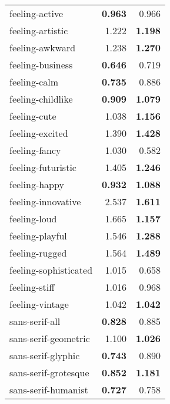 \begin{longtable}{|l|r|r|}
feeling-active            & \textbf{0.963}          & 0.966               \\
feeling-artistic          & 1.222                   & \textbf{1.198}      \\
feeling-awkward           & 1.238                   & \textbf{1.270}      \\
feeling-business          & \textbf{0.646}          & 0.719               \\
feeling-calm              & \textbf{0.735}          & 0.886               \\
feeling-childlike         & \textbf{0.909}          & \textbf{1.079}      \\
feeling-cute              & 1.038                   & \textbf{1.156}      \\
feeling-excited           & 1.390                   & \textbf{1.428}      \\
feeling-fancy             & 1.030                   & 0.582               \\
feeling-futuristic        & 1.405                   & \textbf{1.246}      \\
feeling-happy             & \textbf{0.932}          & \textbf{1.088}      \\
feeling-innovative        & 2.537                   & \textbf{1.611}      \\
feeling-loud              & 1.665                   & \textbf{1.157}      \\
feeling-playful           & 1.546                   & \textbf{1.288}      \\
feeling-rugged            & 1.564                   & \textbf{1.489}      \\
feeling-sophisticated     & 1.015                   & 0.658               \\
feeling-stiff             & 1.016                   & 0.968               \\
feeling-vintage           & 1.042                   & \textbf{1.042}      \\
sans-serif-all            & \textbf{0.828}          & 0.885               \\
sans-serif-geometric      & 1.100                   & \textbf{1.026}      \\
sans-serif-glyphic        & \textbf{0.743}          & 0.890               \\
sans-serif-grotesque      & \textbf{0.852}          & \textbf{1.181}      \\
sans-serif-humanist       & \textbf{0.727}          & 0.758               \\

\end{longtable}
